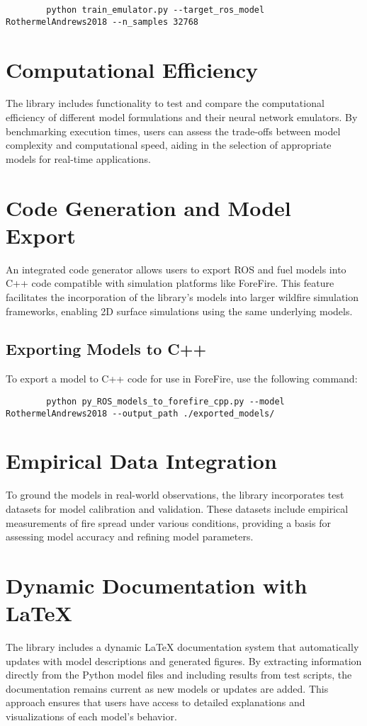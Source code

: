 \documentclass{article}
\begin{document}
	\begin{verbatim}
		python train_emulator.py --target_ros_model RothermelAndrews2018 --n_samples 32768
	\end{verbatim}
	
	\section{Computational Efficiency}
	The library includes functionality to test and compare the computational efficiency of different model formulations and their neural network emulators. By benchmarking execution times, users can assess the trade-offs between model complexity and computational speed, aiding in the selection of appropriate models for real-time applications.
	
	\section{Code Generation and Model Export}
	An integrated code generator allows users to export ROS and fuel models into C++ code compatible with simulation platforms like ForeFire. This feature facilitates the incorporation of the library's models into larger wildfire simulation frameworks, enabling 2D surface simulations using the same underlying models.
	
	\subsection{Exporting Models to C++}
	To export a model to C++ code for use in ForeFire, use the following command:
	
	\begin{verbatim}
		python py_ROS_models_to_forefire_cpp.py --model RothermelAndrews2018 --output_path ./exported_models/
	\end{verbatim}
	
	\section{Empirical Data Integration}
	To ground the models in real-world observations, the library incorporates test datasets for model calibration and validation. These datasets include empirical measurements of fire spread under various conditions, providing a basis for assessing model accuracy and refining model parameters.
	
	\section{Dynamic Documentation with \LaTeX}
	The library includes a dynamic \LaTeX{} documentation system that automatically updates with model descriptions and generated figures. By extracting information directly from the Python model files and including results from test scripts, the documentation remains current as new models or updates are added. This approach ensures that users have access to detailed explanations and visualizations of each model's behavior.
	
\end{document}
